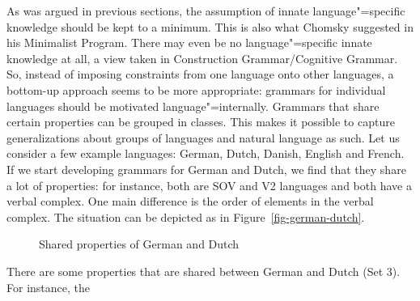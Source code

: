 As was argued in previous sections, the assumption of innate language"=specific knowledge should be
kept to a minimum. This is also what Chomsky suggested in his Minimalist Program. There may even be no language"=specific innate knowledge at all, a view taken in Construction
Grammar/Cognitive Grammar. So, instead of imposing constraints from one language onto other languages, a bottom-up approach seems
to be more appropriate: grammars for individual languages should be motivated language"=internally. Grammars that share certain properties can be grouped in classes. This makes it possible
to capture generalizations about groups of languages and natural language as such. Let us consider a
few example languages: German, Dutch, Danish, English and French. If we start developing grammars for German and
Dutch, we find that they share a lot of properties: for instance, both are SOV and V2 languages and both have a
verbal complex. One main difference is the order of elements in the verbal complex. The situation
can be depicted as in Figure~\vref{fig-german-dutch}.
\begin{figure}
\centering
{}
\caption{\label{fig-german-dutch}Shared properties of German and Dutch}
\end{figure}%
\largerpage[-1]
There are some properties that are shared between German and Dutch (Set 3). For instance, the
